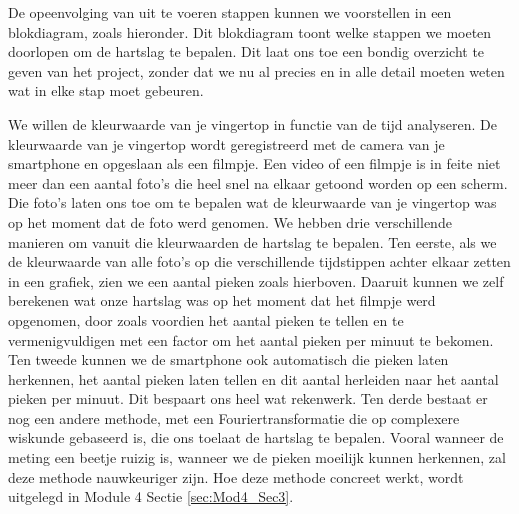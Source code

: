 
De opeenvolging van uit te voeren stappen kunnen we voorstellen in een blokdiagram, zoals hieronder. Dit blokdiagram toont welke stappen we moeten doorlopen om de hartslag te bepalen. Dit laat ons toe een bondig overzicht te geven van het project, zonder dat we nu al precies en in alle detail moeten weten wat in elke stap moet gebeuren.


We willen de kleurwaarde van je vingertop in functie van de tijd analyseren. 
De kleurwaarde van je vingertop wordt geregistreerd met de camera van je smartphone en opgeslaan als een filmpje.
Een video of een filmpje is in feite niet meer dan een aantal foto's die heel snel na elkaar getoond worden op een scherm.
Die foto's laten ons toe om te bepalen wat de kleurwaarde van je vingertop was op het moment dat de foto werd genomen.
We hebben drie verschillende manieren om vanuit die kleurwaarden de hartslag te bepalen.
Ten eerste, als we de kleurwaarde van alle foto's op die verschillende tijdstippen achter elkaar zetten in een grafiek, zien we een aantal pieken zoals hierboven. 
Daaruit kunnen we zelf berekenen wat onze hartslag was op het moment dat het filmpje werd opgenomen, door zoals voordien het aantal pieken te tellen en te vermenigvuldigen met een factor om het aantal pieken per minuut te bekomen.
Ten tweede kunnen we de smartphone ook automatisch die pieken laten herkennen, het aantal pieken laten tellen en dit aantal herleiden naar het aantal pieken per minuut.
Dit bespaart ons heel wat rekenwerk.
Ten derde bestaat er nog een andere methode, met een Fouriertransformatie die op complexere wiskunde gebaseerd is, die ons toelaat de hartslag te bepalen. 
Vooral wanneer de meting een beetje ruizig is, wanneer we de pieken moeilijk kunnen herkennen, zal deze methode nauwkeuriger zijn.
Hoe deze methode concreet werkt, wordt uitgelegd in Module 4 Sectie \ref{sec:Mod4_Sec3}.



